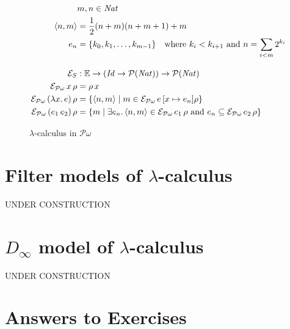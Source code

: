 \documentclass{tufte-handout}
\newcommand{\LAM}[1]{\lambda #1.\,}
\begin{document}
\begin{figure}

\begin{align*}
     & m,n \in \mathit{Nat} \\
\langle n,m \rangle &= \frac{1}{2}(n + m)(n+m+1) + m \\
e_n &= \{ k_0, k_1, \ldots, k_{m-1} \} \quad \text{where }
    k_i < k_{i+1} \text{ and } n = \sum_{i<m} 2^{k_i}\\[2ex]
\ES & : \mathbb{E} \to (\mathit{Id} \to \mathcal{P}(\mathit{Nat})) \to \mathcal{P}(\mathit{Nat}) \\
\mathcal{E}_{\mathcal{P}\omega}\,x\,\rho &= \rho\,x \\  
\mathcal{E}_{\mathcal{P}\omega}\,(\LAM{x}e)\,\rho &= \{ \langle n, m \rangle \mid m \in \mathcal{E}_{\mathcal{P}\omega}\,e\,[x\mapsto e_n]\rho \} \\
\mathcal{E}_{\mathcal{P}\omega}\,(e_1\,e_2)\,\rho &= \{ m \mid \exists e_n. \, 
   \langle n,m \rangle \in \mathcal{E}_{\mathcal{P}\omega}\,e_1\,\rho
   \text{ and } e_n \subseteq \mathcal{E}_{\mathcal{P}\omega}\,e_2\,\rho \}\\
\end{align*}
\caption{$\lambda$-calculus in $\mathcal{P}\omega$}
\label{fig:p-omega}
\end{figure}




\section{Filter models of $\lambda$-calculus}
\label{sec:filter-models}

UNDER CONSTRUCTION

\section{$D_\infty$ model of $\lambda$-calculus}
\label{sec:D-infinity}

UNDER CONSTRUCTION

\clearpage
\pagebreak

\section*{Answers to Exercises}

\shipoutAnswer

\clearpage
\pagebreak



\end{document}

